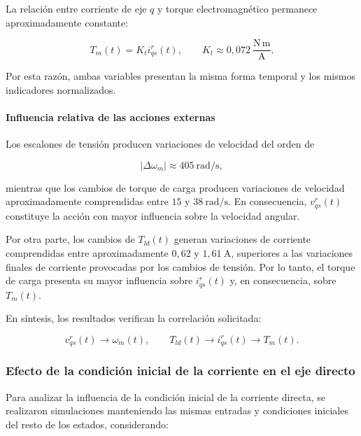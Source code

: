 \documentclass[10pt,a4paper]{article}
\begin{document}
La relación entre corriente de eje $q$ y torque electromagnético permanece
aproximadamente constante:

\begin{equation}
	T_m(t)=K_t i_{qs}^{r}(t),
	\qquad
	K_t \approx 0,072\ \mathrm{\frac{N\,m}{A}}.
\end{equation}

Por esta razón, ambas variables presentan la misma forma temporal y los
mismos indicadores normalizados.

\paragraph{Influencia relativa de las acciones externas}

Los escalones de tensión producen variaciones de velocidad del orden de

\begin{equation}
	\left|\Delta\omega_m\right|
	\approx 405\ \mathrm{rad/s},
\end{equation}

mientras que los cambios de torque de carga producen variaciones de
velocidad aproximadamente comprendidas entre $15$ y
$38~\mathrm{rad/s}$. En consecuencia, $v_{qs}^{r}(t)$ constituye la acción
con mayor influencia sobre la velocidad angular.

Por otra parte, los cambios de $T_{ld}(t)$ generan variaciones de corriente
comprendidas entre aproximadamente $0,62$ y $1,61~\mathrm{A}$, superiores
a las variaciones finales de corriente provocadas por los cambios de
tensión. Por lo tanto, el torque de carga presenta su mayor influencia
sobre $i_{qs}^{r}(t)$ y, en consecuencia, sobre $T_m(t)$.

En síntesis, los resultados verifican la correlación solicitada:

\begin{equation}
	v_{qs}^{r}(t)
	\longrightarrow
	\omega_m(t),
	\qquad
	T_{ld}(t)
	\longrightarrow
	i_{qs}^{r}(t)
	\longrightarrow
	T_m(t).
\end{equation}

\subsubsection{Efecto de la condición inicial de la corriente en el eje directo}

Para analizar la influencia de la condición inicial de la corriente directa,
se realizaron simulaciones manteniendo las mismas entradas y condiciones
iniciales del resto de los estados, considerando:
\end{document}
